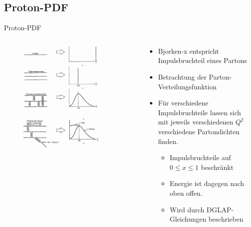 \documentclass[aspectratio=1610, 9pt]{beamer}
\begin{document}
\subsection{Proton-PDF}

\begin{frame}{Proton-PDF}
\begin{columns}
  \begin{column}{0.45\textwidth}
    \begin{figure}
    \centering
    \includegraphics[width=0.8\textwidth]{images/Bjorken-1.png}
  \end{figure}
  \begin{figure}
    \centering
    \includegraphics[width=0.8\textwidth]{images/Bjorken-2.png}
  \end{figure}
  \end{column}
  \begin{column}{0.55\textwidth}
    \begin{itemize}
      \item{Bjorken-x entspricht Impulsbruchteil eines Partons}
      \item{Betrachtung der Parton-Verteilungsfunktion}
      \item{Für verschiedene Impulsbruchteile lassen sich mit jeweils verschiedenen $Q^2$ verschiedene Partondichten finden.}
      \begin{itemize}
        \item{Impulsbruchteile auf $0 \le x \le 1$ beschränkt}
        \item{Energie ist dagegen nach oben offen.}
        \item{Wird durch DGLAP-Gleichungen beschrieben}
      \end{itemize}
    \end{itemize}
  \end{column}
\end{columns}
\end{frame}
\end{document}
